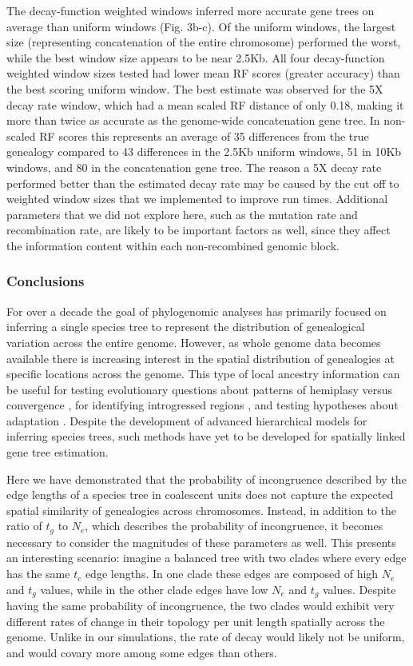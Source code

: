 \documentclass[11pt]{article}
\begin{document}
The decay-function weighted windows inferred more accurate gene trees on average than uniform windows (Fig. 3b-c). Of the uniform windows, the largest size (representing concatenation of the entire chromosome) performed the worst, while the best window size appears to be near 2.5Kb. All four decay-function weighted window sizes tested had lower mean RF scores (greater accuracy) than the best scoring uniform window. The best estimate was observed for the 5X decay rate window, which had a mean scaled RF distance of only 0.18, making it more than  twice as accurate as the genome-wide concatenation gene tree. In non-scaled RF scores this represents an average of 35 differences from the true genealogy compared to 43 differences in the 2.5Kb uniform windows, 51 in 10Kb windows, and 80 in the concatenation gene tree. The reason a 5X decay rate performed better than the estimated decay rate may be caused by the cut off to weighted window sizes that we implemented to improve run times. Additional parameters that we did not explore here, such as the mutation rate and recombination rate, are likely to be important factors as well, since they affect the information content within each non-recombined genomic block.


\subsubsection*{Conclusions}
For over a decade the goal of phylogenomic analyses has primarily focused on inferring a single species tree to represent the distribution of genealogical variation across the entire genome. However, as whole genome data becomes available there is increasing interest in the spatial distribution of genealogies at specific locations across the genome. This type of local ancestry information can be useful for testing evolutionary questions about patterns of hemiplasy versus convergence \citep{guerrero_quantifying_2018}, for identifying introgressed regions \citep{fang_estimating_2020}, and testing hypotheses about adaptation \citep{martin_recombination_2019}. Despite the development of advanced hierarchical models for inferring species trees, such methods have yet to be developed for spatially linked gene tree estimation.

Here we have demonstrated that the probability of incongruence described by the edge lengths of a species tree in coalescent units does not capture the expected spatial similarity of genealogies across chromosomes. Instead, in addition to the ratio of $t_g$ to $N_e$, which describes the probability of incongruence, it becomes necessary to consider the magnitudes of these parameters as well. This presents an interesting scenario: imagine a balanced tree with two clades where every edge has the same $t_c$ edge lengths. In one clade these edges are composed of high $N_e$ and $t_g$ values, while in the other clade edges have low $N_e$ and $t_g$ values. Despite having the same probability of incongruence, the two clades would exhibit very different rates of change in their topology per unit length spatially across the genome. Unlike in our simulations, the rate of decay would likely not be uniform, and would covary more among some edges than others. 
\end{document}
